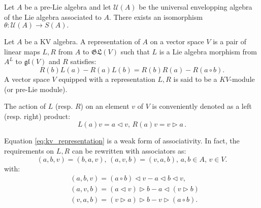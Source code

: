 \begin{thm}
    \label{thm:pbw_prelie}
    Let $A$ be a pre-Lie algebra and let $\mathcal{U}(A)$ be the universal envelopping algebra of the Lie algebra associated to $A$. There exists an isomorphism 
$\theta \colon \mathcal{U}(A) \to S(A).$
\end{thm}
\begin{defn}
Let $A$ be a KV algebra. A representation of $A$ on a vector space $V$ is a pair of linear maps $L,R$ from $A$ to $\mathfrak{GL}(V)$ such that $L$ is a Lie algebra morphism 
from $A^{L}$ to $\mathfrak{gl}(V)$ and $R$ satisfies:
\begin{equation}
    \label{eq:kv_representation}
    R(b)L(a)-R(a)L(b)=R(b)R(a)-R(a \circ b).
\end{equation}
A vector space $V$ equipped with a representation $L,R$ is said to be a $KV$-module (or pre-Lie module). 
\end{defn}
\begin{notation}
The action of $L$ (resp. $R$) on an element $v$ of $V$ is conveniently denoted as a left (resp. right) product:
\[
L(a)v = a \triangleleft v, \, R(a)v = v \triangleright a \, .
\]
\end{notation}
\begin{rem}
    Equation \ref{eq:kv_representation} is a weak form of associativity. In fact, the requirements on $L,R$ can be rewritten with associators as:
    \begin{equation}
        \label{eq:module_associator}
        \left( a, b, v \right) = \left( b, a , v \right), \, \left( a, v, b \right) = \left( v, a,b \right), \, a,b \in A, \, v \in V.
    \end{equation}
with:
\begin{equation}
    \begin{split}
    &\left( a,b,v \right) = \left( a \circ b \right) \triangleleft v - a \triangleleft b \triangleleft v, \\ 
    &\left( a, v, b \right) = \left( a \triangleleft v \right) \triangleright b - a \triangleleft \left( v \triangleright b \right) \\
    &\left( v, a, b \right) = \left( v \triangleright a \right) \triangleright b - v \triangleright \left( a \circ b \right).
    \end{split}
\end{equation}
\end{rem}
